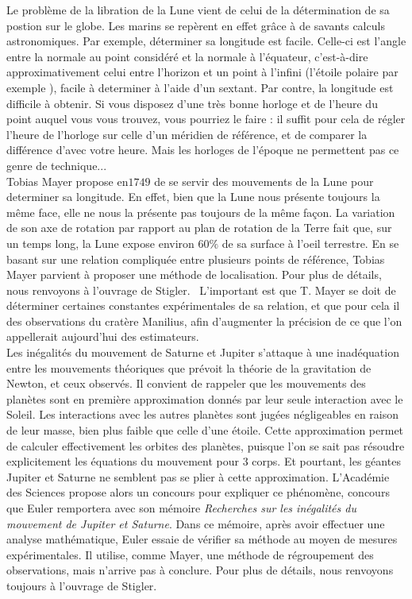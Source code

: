 \documentclass{article}
\begin{document}
Le problème de la libration de la Lune vient de celui de la détermination de sa postion sur le globe. Les marins se repèrent en effet grâce à de savants calculs astronomiques. Par exemple, déterminer sa longitude est facile. Celle-ci est l'angle entre la normale au point considéré et la normale à l'équateur, c'est-à-dire approximativement celui entre l'horizon et un point à l'infini (l'étoile polaire par exemple \label{ellipse}), facile à determiner à l'aide d'un sextant. Par contre, la longitude est difficile à obtenir. Si vous disposez d'une très bonne horloge et de l'heure du point auquel vous vous trouvez, vous pourriez le faire : il suffit pour cela de régler l'heure de l'horloge sur celle d'un méridien de référence, et de comparer la différence d'avec votre heure. Mais les horloges de l'époque ne permettent pas ce genre de technique... \\

Tobias Mayer propose en$1749$ de se servir des mouvements de la Lune pour determiner sa longitude. En effet, bien que la Lune nous présente toujours la même face, elle ne nous la présente pas toujours de la même façon. La variation de son axe de rotation par rapport au plan de rotation de la Terre fait que, sur un temps long, la Lune expose environ $60\%$ de sa surface à l'oeil terrestre. En se basant sur une relation compliquée entre plusieurs points de référence, Tobias Mayer parvient à proposer une méthode de localisation. Pour plus de détails, nous renvoyons à l'ouvrage de Stigler.~\cite{Stigler} L'important est que T. Mayer se doit de déterminer certaines constantes expérimentales de sa relation, et que pour cela il des observations du cratère Manilius, afin d'augmenter la précision de ce que l'on appellerait aujourd'hui des estimateurs.\\ 

Les inégalités du mouvement de Saturne et Jupiter s'attaque à une inadéquation entre les mouvements théoriques que prévoit la théorie de la gravitation de Newton, et ceux observés. Il convient de rappeler que les mouvements des planètes sont en première approximation donnés par leur seule interaction avec le Soleil. Les interactions avec les autres planètes sont jugées négligeables en raison de leur masse, bien plus faible que celle d'une étoile. Cette approximation permet de calculer effectivement les orbites des planètes, puisque l'on se sait pas résoudre explicitement les équations du mouvement pour $3$ corps. Et pourtant, les géantes Jupiter et Saturne ne semblent pas se plier à cette approximation. L'Académie des Sciences propose alors un concours pour expliquer ce phénomène, concours que Euler remportera avec son mémoire \textit{Recherches sur les inégalités du mouvement de Jupiter et Saturne}. Dans ce mémoire, après avoir effectuer une analyse mathématique, Euler essaie de vérifier sa méthode au moyen de mesures expérimentales. Il utilise, comme Mayer, une méthode de régroupement des observations, mais n'arrive pas à conclure. Pour plus de détails, nous renvoyons toujours à l'ouvrage de Stigler. ~\cite{Stigler}\\
\end{document}

